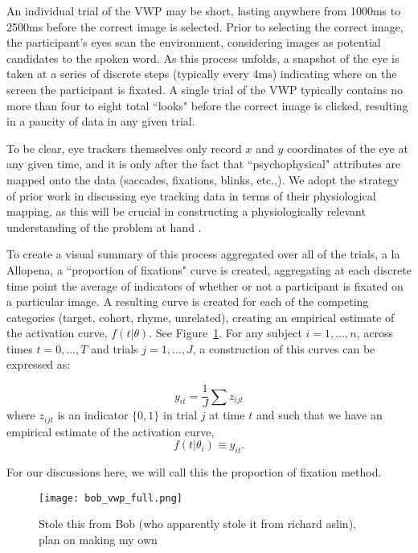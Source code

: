 An individual trial of the VWP may be short, lasting anywhere from 1000ms to 2500ms before the correct image is selected. Prior to selecting the correct image, the participant's eyes scan the environment, considering images as potential candidates to the spoken word. As this process unfolds, a snapshot of the eye is taken at a series of discrete steps (typically every 4ms) indicating where on the screen the participant is fixated. A single trial of the VWP typically contains no more than four to eight total ``looks" before the correct image is clicked, resulting in a paucity of data in any given trial.

To be clear, eye trackers themselves only record $x$ and $y$ coordinates of the eye at any given time, and it is only after the fact that ``psychophysical" attributes are mapped onto the data (saccades, fixations, blinks, etc.,). We adopt the strategy of prior work in discussing eye tracking data in terms of their physiological mapping, as this will be crucial in constructing a physiologically relevant understanding of the problem at hand \cite{mcmurray2002look}.


To create a visual summary of this process aggregated over all of the trials, a la Allopena, a ``proportion of fixations" curve is created, aggregating at each discrete time point the average of indicators of whether or not a participant is fixated on a particular image. A resulting curve is created for each of the competing categories (target, cohort, rhyme, unrelated), creating an empirical estimate of the activation curve, $f(t|\theta)$. See Figure~\ref{fig:bob_diagram_full}. For any subject $i = 1, \dots, n$, across times $t = 0, \dots, T$ and trials $j = 1, \dots, J$, a construction  of this curves can be expressed as:


\begin{equation}\label{eq:sum_proportions}
y_{it} = \frac1J \sum z_{ijt}
\end{equation}
where $z_{ijt}$ is an indicator $\{0, 1\}$ in trial $j$ at time $t$ and such that we have an empirical estimate of the activation curve,
\begin{equation}\label{eq:empir_to_activation}
f(t | \theta_i) \equiv y_{it}.
\end{equation}



For our discussions here, we will call this the proportion of fixation method.


\begin{figure}[H]
\centering
\texttt{[image: bob\_vwp\_full.png]}
\caption{Stole this from Bob (who apparently stole it from richard aslin), plan on making my own}
\label{fig:bob_diagram_full}
\end{figure}


